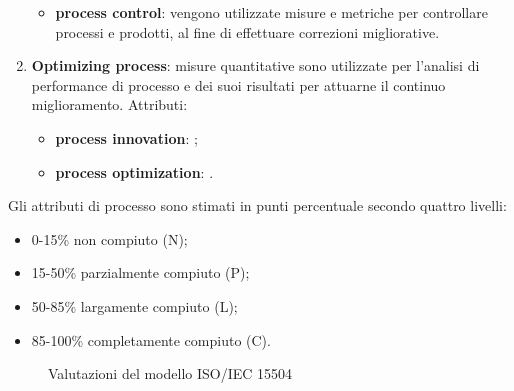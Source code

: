 \begin{enumerate}
\begin{itemize}
			\item \textbf{process control}: vengono utilizzate misure e metriche per controllare processi e prodotti, al fine di effettuare correzioni migliorative.
		\end{itemize}
	\item \textbf{Optimizing process}: misure quantitative sono utilizzate per l'analisi di performance di processo e dei suoi risultati per attuarne il continuo miglioramento. Attributi:
		\begin{itemize}
			\item \textbf{process innovation}: ;
			\item \textbf{process optimization}: .
		\end{itemize}
\end{enumerate}
Gli attributi di processo sono stimati in punti percentuale secondo quattro livelli: 
\begin{itemize}
	\item 0-15\% non compiuto (N);
	\item 15-50\% parzialmente compiuto (P);
	\item 50-85\% largamente compiuto (L);
	\item 85-100\% completamente compiuto (C).
\end{itemize}
\begin{figure}[H]
	\centering
	
	\caption{Valutazioni del modello ISO/IEC 15504}
\end{figure}